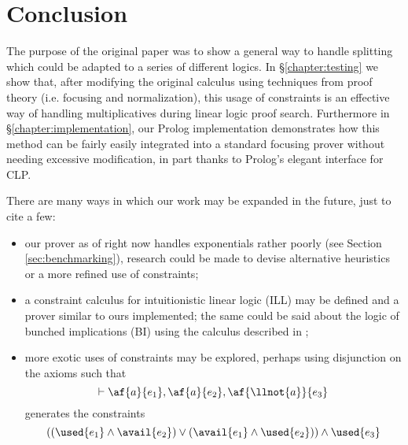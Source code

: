 \chapter{Conclusion}\label{chapter:conclusion}
The purpose of the original paper \cite{HarlandPym} was to show a general way to handle splitting which could be adapted to a series of different logics.
In \S\ref{chapter:testing} we show that, after modifying the original calculus using techniques from proof theory (i.e. focusing \cite{Focusing} and normalization), this usage of constraints is an effective way of handling multiplicatives during linear logic proof search.
Furthermore in \S\ref{chapter:implementation}, our Prolog implementation demonstrates how this method can be fairly easily integrated into a standard focusing prover without needing excessive modification, in part thanks to Prolog's elegant interface for CLP.

There are many ways in which our work may be expanded in the future, just to cite a few:
\begin{itemize}
	\item our prover as of right now handles exponentials rather poorly (see Section \ref{sec:benchmarking}), research could be made to devise alternative heuristics or a more refined use of constraints;
	\item a constraint calculus for intuitionistic linear logic (ILL) may be defined and a prover similar to ours implemented; the same could be said about the logic of bunched implications (BI) using the calculus described in \cite{HarlandPym};
	\item more exotic uses of constraints may be explored, perhaps using disjunction on the axioms such that
		$$ \vdash \af{a}{e_1}, \af{a}{e_2}, \af{\llnot{a}}{e_3} $$
	generates the constraints
		$$ ((\used{e_1} \wedge \avail{e_2}) \vee (\avail{e_1} \wedge \used{e_2})) \wedge \used{e_3} $$
\end{itemize}
